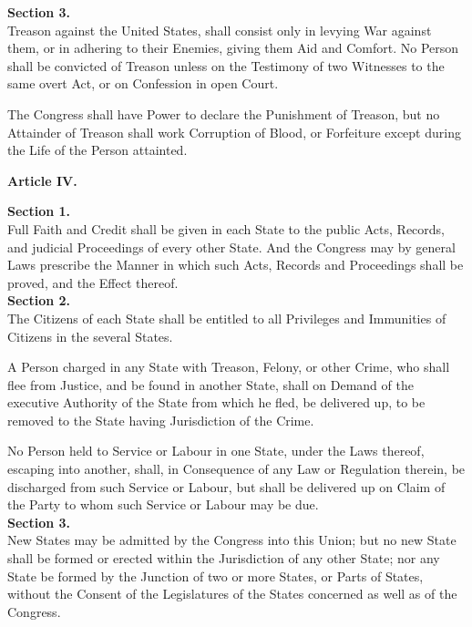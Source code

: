 {\large \textbf{Section 3.}}\\[0.01in]

Treason against the United States, shall consist only in levying War against them, or in adhering to their Enemies, giving them Aid and Comfort. No Person shall be convicted of Treason unless on the Testimony of two Witnesses to the same overt Act, or on Confession in open Court.

The Congress shall have Power to declare the Punishment of Treason, but no Attainder of Treason shall work Corruption of Blood, or Forfeiture except during the Life of the Person attainted.\\[0.01in]

\begin{center}
{\Large \textbf{Article IV.}}
\end{center}

{\large \textbf{Section 1.}}\\[0.01in]

Full Faith and Credit shall be given in each State to the public Acts, Records, and judicial Proceedings of every other State. And the Congress may by general Laws prescribe the Manner in which such Acts, Records and Proceedings shall be proved, and the Effect thereof.\\[0.01in]

{\large \textbf{Section 2.}}\\[0.01in]

The Citizens of each State shall be entitled to all Privileges and Immunities of Citizens in the several States.

A Person charged in any State with Treason, Felony, or other Crime, who shall flee from Justice, and be found in another State, shall on Demand of the executive Authority of the State from which he fled, be delivered up, to be removed to the State having Jurisdiction of the Crime.

No Person held to Service or Labour in one State, under the Laws thereof, escaping into another, shall, in Consequence of any Law or Regulation therein, be discharged from such Service or Labour, but shall be delivered up on Claim of the Party to whom such Service or Labour may be due.\\[0.01in]

{\large \textbf{Section 3.}}\\[0.01in]

New States may be admitted by the Congress into this Union; but no new State shall be formed or erected within the Jurisdiction of any other State; nor any State be formed by the Junction of two or more States, or Parts of States, without the Consent of the Legislatures of the States concerned as well as of the Congress.

